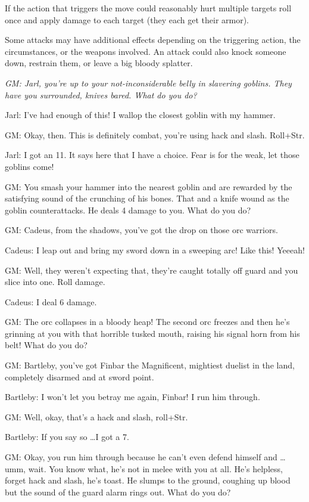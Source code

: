 If the action that triggers the move could reasonably hurt multiple targets roll once and apply damage to each target (they each get their armor).

Some attacks may have additional effects depending on the triggering action, the circumstances, or the weapons involved. An attack could also knock someone down, restrain them, or leave a big bloody splatter.

{\itshape
GM: Jarl, you're up to your not-inconsiderable belly in slavering goblins. They have you surrounded, knives bared. What do you do?

Jarl: I've had enough of this! I wallop the closest goblin with my hammer.

GM: Okay, then. This is definitely combat, you're using hack and slash. Roll+Str.

Jarl: I got an 11. It says here that I have a choice. Fear is for the weak, let those goblins come!

GM: You smash your hammer into the nearest goblin and are rewarded by the satisfying sound of the crunching of his bones. That and a knife wound as the goblin counterattacks. He deals 4 damage to you. What do you do?

GM: Cadeus, from the shadows, you've got the drop on those orc warriors.

Cadeus: I leap out and bring my sword down in a sweeping arc! Like this! Yeeeah!

GM: Well, they weren't expecting that, they're caught totally off guard and you slice into one. Roll damage.

Cadeus: I deal 6 damage.

GM: The orc collapses in a bloody heap! The second orc freezes and then he's grinning at you with that horrible tusked mouth, raising his signal horn from his belt! What do you do?

GM: Bartleby, you've got Finbar the Magnificent, mightiest duelist in the land, completely disarmed and at sword point.

Bartleby: I won't let you betray me again, Finbar! I run him through.

GM: Well, okay, that's a hack and slash, roll+Str.

Bartleby: If you say so \ldots  I got a 7.

GM: Okay, you run him through because he can't even defend himself and \ldots  umm, wait. You know what, he's not in melee with you at all. He's helpless, forget hack and slash, he's toast. He slumps to the ground, coughing up blood but the sound of the guard alarm rings out. What do you do?
}
